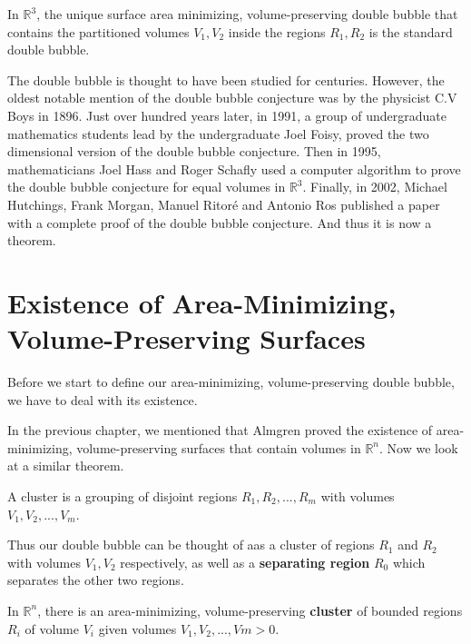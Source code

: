 \documentclass[a4paper,12pt]{report}
\begin{document}
\begin{theorem}
In $\mathbb{R}^{3}$, the unique surface area minimizing, volume-preserving double bubble that contains the partitioned volumes $V_{1},V_{2}$ inside the regions $R_{1},R_{2}$ is the standard double bubble.
\end{theorem}

The double bubble is thought to have been studied for centuries. However, the oldest notable mention of the double bubble conjecture was by the physicist C.V Boys in 1896. Just over hundred years later, in 1991, a group of undergraduate mathematics students lead by the undergraduate Joel Foisy, proved the two dimensional version of the double bubble conjecture. Then in 1995, mathematicians Joel Hass and Roger Schafly used a computer algorithm to prove the double bubble conjecture for equal volumes in $\mathbb{R}^{3}$. Finally, in 2002, Michael Hutchings, Frank Morgan, Manuel Ritor\'e and Antonio Ros published a paper with a complete proof of the double bubble conjecture. And thus it is now a theorem.

\section{Existence of Area-Minimizing, Volume-Preserving Surfaces}

Before we start to define our area-minimizing, volume-preserving double bubble, we have to deal with its existence.

\hspace{-0.66cm}In the previous chapter, we mentioned that Almgren proved the existence of area-minimizing, volume-preserving surfaces that contain volumes in $\mathbb{R}^{n}$. Now we look at a similar theorem.

\begin{definition}
A cluster is a grouping of disjoint regions $R_{1}, R_{2}, ... , R_{m}$ with volumes $V_{1}, V_{2}, ... , V_{m}$.
\end{definition}

Thus our double bubble can be thought of aas a cluster of regions $R_{1}$ and $R_{2}$ with volumes $V_{1}, V_{2}$ respectively, as well as a \textbf{separating region} $R_{0}$ which separates the other two regions.

\begin{theorem}
In $\mathbb{R}^{n}$, there is an area-minimizing, volume-preserving \textbf{cluster} of bounded regions $R_{i}$ of volume $V_{i}$ given volumes $V_{1}, V_{2}, ... , Vm > 0$.
\end{theorem}
\end{document}

